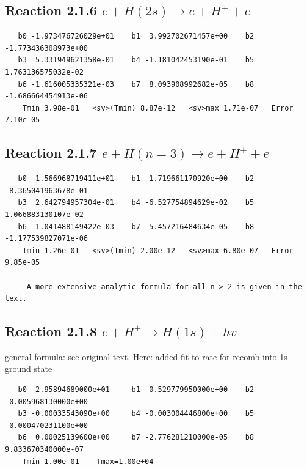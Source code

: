 \documentclass[12pt,dvipdfmx]{article}
\begin{document}
\newpage
\subsection{
Reaction 2.1.6 $   e + H(2s) \rightarrow e + H^+ + e$}


\begin{small}\begin{verbatim}
   b0 -1.973476726029e+01    b1  3.992702671457e+00    b2 -1.773436308973e+00
   b3  5.331949621358e-01    b4 -1.181042453190e-01    b5  1.763136575032e-02
   b6 -1.616005335321e-03    b7  8.093908992682e-05    b8 -1.686664454913e-06
    Tmin 3.98e-01   <sv>(Tmin) 8.87e-12   <sv>max 1.71e-07   Error 7.10e-05
\end{verbatim}\end{small}

\newpage
\subsection{
Reaction 2.1.7 $   e + H(n=3) \rightarrow e + H^+ + e$}


\begin{small}\begin{verbatim}
   b0 -1.566968719411e+01    b1  1.719661170920e+00    b2 -8.365041963678e-01
   b3  2.642794957304e-01    b4 -6.527754894629e-02    b5  1.066883130107e-02
   b6 -1.041488149422e-03    b7  5.457216484634e-05    b8 -1.177539827071e-06
    Tmin 1.26e-01   <sv>(Tmin) 2.00e-12   <sv>max 6.80e-07   Error 9.85e-05

     A more extensive analytic formula for all n > 2 is given in the text.
\end{verbatim}\end{small}

\newpage
\subsection{
Reaction 2.1.8 $  e + H^+ \rightarrow H(1s) + hv $}
general formula: see original text. Here:  added fit to rate for recomb into 1s ground state

\begin{small}\begin{verbatim}
   b0 -2.95894689000e+01     b1 -0.529779950000e+00    b2 -0.005968130000e+00
   b3 -0.00033543090e+00     b4 -0.003004446800e+00    b5 -0.000470231100e+00
   b6  0.00025139600e+00     b7 -2.776281210000e-05    b8  9.833670340000e-07
    Tmin 1.00e-01    Tmax=1.00e+04
\end{verbatim}\end{small}
\end{document}
